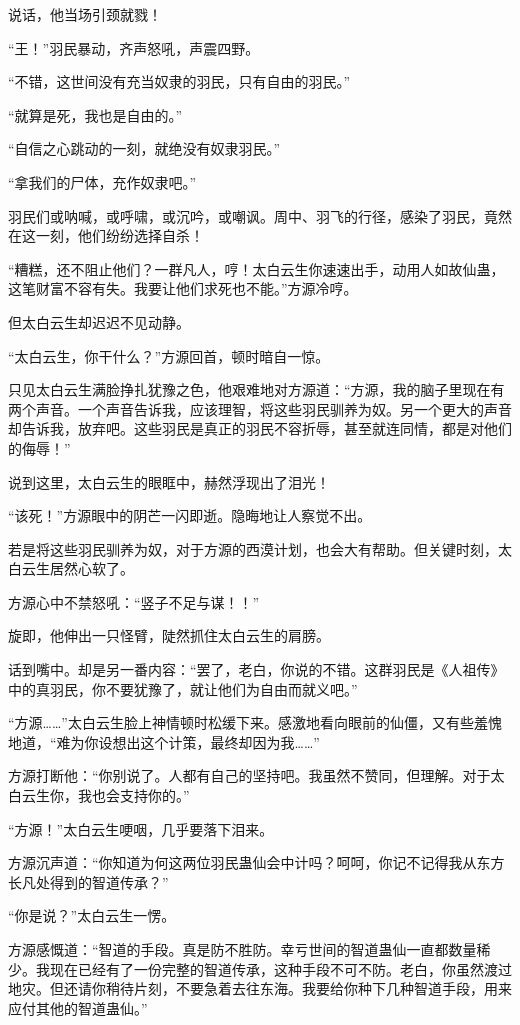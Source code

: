 \begin{this_body}
说话，他当场引颈就戮！

“王！”羽民暴动，齐声怒吼，声震四野。

“不错，这世间没有充当奴隶的羽民，只有自由的羽民。”

“就算是死，我也是自由的。”

“自信之心跳动的一刻，就绝没有奴隶羽民。”

“拿我们的尸体，充作奴隶吧。”

羽民们或呐喊，或呼啸，或沉吟，或嘲讽。周中、羽飞的行径，感染了羽民，竟然在这一刻，他们纷纷选择自杀！

“糟糕，还不阻止他们？一群凡人，哼！太白云生你速速出手，动用人如故仙蛊，这笔财富不容有失。我要让他们求死也不能。”方源冷哼。

但太白云生却迟迟不见动静。

“太白云生，你干什么？”方源回首，顿时暗自一惊。

只见太白云生满脸挣扎犹豫之色，他艰难地对方源道：“方源，我的脑子里现在有两个声音。一个声音告诉我，应该理智，将这些羽民驯养为奴。另一个更大的声音却告诉我，放弃吧。这些羽民是真正的羽民不容折辱，甚至就连同情，都是对他们的侮辱！”

说到这里，太白云生的眼眶中，赫然浮现出了泪光！

“该死！”方源眼中的阴芒一闪即逝。隐晦地让人察觉不出。

若是将这些羽民驯养为奴，对于方源的西漠计划，也会大有帮助。但关键时刻，太白云生居然心软了。

方源心中不禁怒吼：“竖子不足与谋！！”

旋即，他伸出一只怪臂，陡然抓住太白云生的肩膀。

话到嘴中。却是另一番内容：“罢了，老白，你说的不错。这群羽民是《人祖传》中的真羽民，你不要犹豫了，就让他们为自由而就义吧。”

“方源……”太白云生脸上神情顿时松缓下来。感激地看向眼前的仙僵，又有些羞愧地道，“难为你设想出这个计策，最终却因为我……”

方源打断他：“你别说了。人都有自己的坚持吧。我虽然不赞同，但理解。对于太白云生你，我也会支持你的。”

“方源！”太白云生哽咽，几乎要落下泪来。

方源沉声道：“你知道为何这两位羽民蛊仙会中计吗？呵呵，你记不记得我从东方长凡处得到的智道传承？”

“你是说？”太白云生一愣。

方源感慨道：“智道的手段。真是防不胜防。幸亏世间的智道蛊仙一直都数量稀少。我现在已经有了一份完整的智道传承，这种手段不可不防。老白，你虽然渡过地灾。但还请你稍待片刻，不要急着去往东海。我要给你种下几种智道手段，用来应付其他的智道蛊仙。”


\end{this_body}
